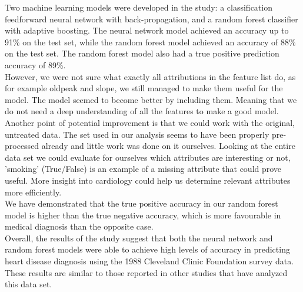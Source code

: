 \documentclass[reprint,english,notitlepage]{revtex4-1}  %
\begin{document}
Two machine learning models were developed in the study: a classification feedforward neural network with back-propagation, and a random forest classifier with adaptive boosting. The neural network model achieved an accuracy up to 91\% on the test set, while the random forest model achieved an accuracy of 88\% on the test set. The random forest model also had a true positive prediction accuracy of 89\%.
\vspace{3mm}
\\
However, we were not sure what exactly all attributions in the feature list do, as for example oldpeak and slope, we still managed to make them useful for the model. The model seemed to become better by including them. Meaning that we do not need a deep understanding of all the features to make a good model.
\vspace{3mm}
\\
Another point of potential improvement is that we could work with the original, untreated data. The set used in our analysis seems to have been properly pre-processed already and little work was done on it ourselves. Looking at the entire data set we could evaluate for ourselves which attributes are interesting or not, 'smoking' (True/False) is an example of a missing attribute that could prove useful. More insight into cardiology could help us determine relevant attributes more efficiently.
\vspace{3mm}
\\
We have demonstrated that the true positive accuracy in our random forest model is higher than the true negative accuracy, which is more favourable in medical diagnosis than the opposite case.
\vspace{3mm}
\\
Overall, the results of the study suggest that both the neural network and random forest models were able to achieve high levels of accuracy in predicting heart disease diagnosis using the 1988 Cleveland Clinic Foundation survey data. These results are similar to those reported in other studies that have analyzed this data set.



\end{document}
